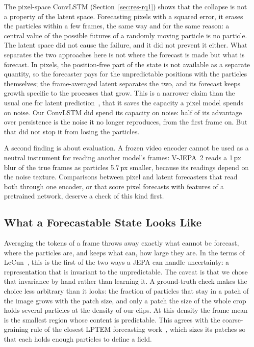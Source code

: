 The pixel-space ConvLSTM (Section~\ref{sec:res-rq1}) shows that the collapse is not a
property of the latent space. Forecasting pixels with a squared error, it erases the
particles within a few frames, the same way and for the same reason: a central value of
the possible futures of a randomly moving particle is no particle. The latent space did
not cause the failure, and it did not prevent it either. What separates the two
approaches here is not where the forecast is made but what is forecast. In pixels, the
position-free part of the state is not available as a separate quantity, so the
forecaster pays for the unpredictable positions with the particles themselves; the
frame-averaged latent separates the two, and its forecast keeps growth specific to the
processes that grow. This is a narrower claim than the usual one for latent
prediction~\cite{lecun2022path, assran2025vjepa2}, that it saves the capacity a pixel
model spends on noise. Our ConvLSTM did spend its capacity on noise: half of its
advantage over persistence is the noise it no longer reproduces, from the first frame
on. But that did not stop it from losing the particles.

A second finding is about evaluation. A frozen video encoder cannot be used as a neutral
instrument for reading another model's frames: V-JEPA~2 reads a 1\,px blur of the true
frames as particles 5.7\,px smaller, because its readings depend on the noise texture.
Comparisons between pixel and latent forecasters that read both through one encoder,
or that score pixel forecasts with features of a pretrained network, deserve a check of
this kind first.

\subsection{What a Forecastable State Looks Like}

Averaging the tokens of a frame throws away exactly what cannot be forecast, where the
particles are, and keeps what can, how large they are. In the terms of
LeCun~\cite{lecun2022path}, this is the first of the two ways a JEPA can handle
uncertainty: a representation that is invariant to the unpredictable. The caveat is that
we chose that invariance by hand rather than learning it. A ground-truth check makes the
choice less arbitrary than it looks: the fraction of particles that stay in a patch of
the image grows with the patch size, and only a patch the size of the whole crop holds
several particles at the density of our clips. At this density the frame mean is the
smallest region whose content is predictable. This agrees with the coarse-graining rule
of the closest LPTEM forecasting work~\cite{li2026multiscale}, which sizes its patches so that
each holds enough particles to define a field.

